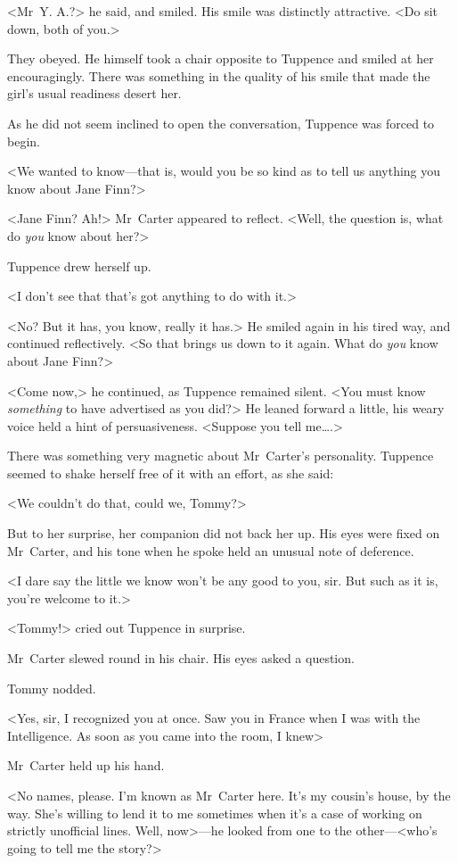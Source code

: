 <Mr~Y. A.?> he said, and smiled. His smile was distinctly attractive. <Do sit down, both of you.>

They obeyed. He himself took a chair opposite to Tuppence and smiled at her encouragingly. There was something in the quality of his smile that made the girl's usual readiness desert her.

As he did not seem inclined to open the conversation, Tuppence was forced to begin.

<We wanted to know—that is, would you be so kind as to tell us anything you know about Jane Finn?>

<Jane Finn? Ah!> Mr~Carter appeared to reflect. <Well, the question is, what do \textit{you} know about her?>

Tuppence drew herself up.

<I don't see that that's got anything to do with it.>

<No? But it has, you know, really it has.> He smiled again in his tired way, and continued reflectively. <So that brings us down to it again. What do \emph{you} know about Jane Finn?>

<Come now,> he continued, as Tuppence remained silent. <You must know \emph{something} to have advertised as you did?> He leaned forward a little, his weary voice held a hint of persuasiveness. <Suppose you tell me\dots.>

There was something very magnetic about Mr~Carter's personality. Tuppence seemed to shake herself free of it with an effort, as she said:

<We couldn't do that, could we, Tommy?>

But to her surprise, her companion did not back her up. His eyes were fixed on Mr~Carter, and his tone when he spoke held an unusual note of deference.

<I dare say the little we know won't be any good to you, sir. But such as it is, you're welcome to it.>

<Tommy!> cried out Tuppence in surprise.

Mr~Carter slewed round in his chair. His eyes asked a question.

Tommy nodded.

<Yes, sir, I recognized you at once. Saw you in France when I was with the Intelligence. As soon as you came into the room, I knew\longdash>

Mr~Carter held up his hand.

<No names, please. I'm known as Mr~Carter here. It's my cousin's house, by the way. She's willing to lend it to me sometimes when it's a case of working on strictly unofficial lines. Well, now>—he looked from one to the other—<who's going to tell me the story?>

